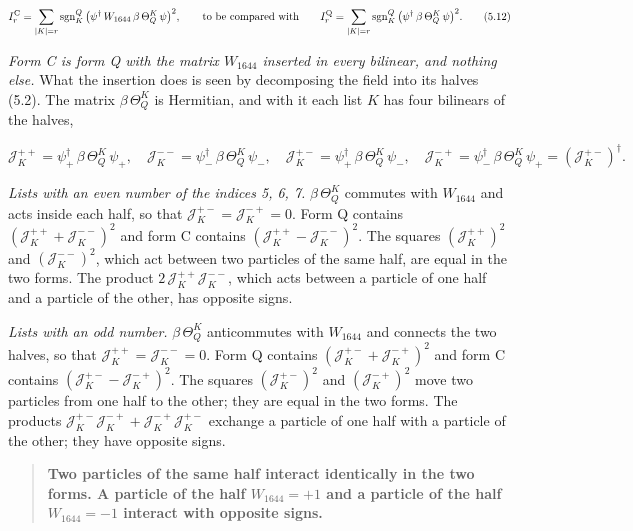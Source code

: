 \documentclass[
  10pt,
]{article}
\begin{document}
\[I_r^{\rm C}=\sum_{|K|=r}\mathrm{sgn}^Q_K\,\big(\psi^\dagger\,W_{1644}\,\beta\,\Theta_Q^K\,\psi\big)^2,
\qquad\text{to be compared with}\qquad
I_r^{\rm Q}=\sum_{|K|=r}\mathrm{sgn}^Q_K\,\big(\psi^\dagger\,\beta\,\Theta_Q^K\,\psi\big)^2.\tag{5.12}\]

\emph{Form C is form Q with the matrix \(W_{1644}\) inserted in every
bilinear, and nothing else.} What the insertion does is seen by
decomposing the field into its halves (5.2). The matrix
\(\beta\,\Theta_Q^K\) is Hermitian, and with it each list \(K\) has four
bilinears of the halves,

\[\mathcal J_K^{++}=\psi_+^\dagger\,\beta\,\Theta_Q^K\,\psi_+,\quad
\mathcal J_K^{--}=\psi_-^\dagger\,\beta\,\Theta_Q^K\,\psi_-,\quad
\mathcal J_K^{+-}=\psi_+^\dagger\,\beta\,\Theta_Q^K\,\psi_-,\quad
\mathcal J_K^{-+}=\psi_-^\dagger\,\beta\,\Theta_Q^K\,\psi_+=(\mathcal J_K^{+-})^\dagger.\]

\emph{Lists with an even number of the indices 5, 6, 7.}
\(\beta\,\Theta_Q^K\) commutes with \(W_{1644}\) and acts inside each
half, so that \(\mathcal J_K^{+-}=\mathcal J_K^{-+}=0\). Form Q contains
\((\mathcal J_K^{++}+\mathcal J_K^{--})^2\) and form C contains
\((\mathcal J_K^{++}-\mathcal J_K^{--})^2\). The squares
\((\mathcal J_K^{++})^2\) and \((\mathcal J_K^{--})^2\), which act
between two particles of the same half, are equal in the two forms. The
product \(2\,\mathcal J_K^{++}\mathcal J_K^{--}\), which acts between a
particle of one half and a particle of the other, has opposite signs.

\emph{Lists with an odd number.} \(\beta\,\Theta_Q^K\) anticommutes with
\(W_{1644}\) and connects the two halves, so that
\(\mathcal J_K^{++}=\mathcal J_K^{--}=0\). Form Q contains
\((\mathcal J_K^{+-}+\mathcal J_K^{-+})^2\) and form C contains
\((\mathcal J_K^{+-}-\mathcal J_K^{-+})^2\). The squares
\((\mathcal J_K^{+-})^2\) and \((\mathcal J_K^{-+})^2\) move two
particles from one half to the other; they are equal in the two forms.
The products
\(\mathcal J_K^{+-}\mathcal J_K^{-+}+\mathcal J_K^{-+}\mathcal J_K^{+-}\)
exchange a particle of one half with a particle of the other; they have
opposite signs.

\begin{quote}
\textbf{Two particles of the same half interact identically in the two
forms. A particle of the half \(W_{1644}=+1\) and a particle of the half
\(W_{1644}=-1\) interact with opposite signs.}
\end{quote}
\end{document}
